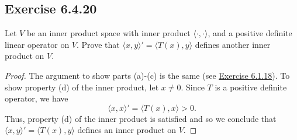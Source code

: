\subsection*{Exercise 6.4.20} Let \( V  \) be an inner product space with inner product \( \langle \cdot , \cdot \rangle \), and a positive definite linear operator on \( V  \). Prove that \( \langle x , y \rangle' = \langle T(x) , y \rangle \) defines another inner product on \( V  \).
\begin{proof}
    The argument to show parts (a)-(c) is the same (see {\hyperref[Exercise 6.1.18]{Exercise 6.1.18}}). To show property (d) of the inner product, let \( x \neq 0  \). Since \( T  \) is a positive definite operator, we have \[ \langle x , x \rangle' = \langle T(x) , x \rangle > 0.  \]
    Thus, property (d) of the inner product is satisfied and so we conclude that \( \langle x , y \rangle' = \langle T(x) , y \rangle  \) defines an inner product on \( V  \).
\end{proof}
